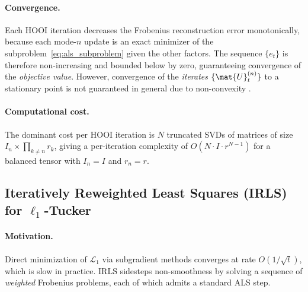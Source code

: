 \paragraph{Convergence.}
Each HOOI iteration decreases the Frobenius reconstruction error
monotonically, because each mode-$n$ update is an exact minimizer of the
subproblem~\eqref{eq:als_subproblem} given the other factors.
The sequence $\{e_t\}$ is therefore non-increasing and bounded below by
zero, guaranteeing convergence of the \emph{objective value}.
However, convergence of the \emph{iterates} $\{\mat{U}^{(n)}_t\}$ to a
stationary point is not guaranteed in general due to non-convexity
\cite{de2000best}.

\paragraph{Computational cost.}
The dominant cost per HOOI iteration is $N$ truncated SVDs of matrices of
size $I_n \times \prod_{k \neq n} r_k$, giving a per-iteration complexity
of $O\!\left(N \cdot I \cdot r^{N-1}\right)$ for a balanced tensor with
$I_n = I$ and $r_n = r$.

\subsection{Iteratively Reweighted Least Squares (IRLS) for $\ell_1$-Tucker}
\label{subsec:irls}

\paragraph{Motivation.}
Direct minimization of $\mathcal{L}_1$ via subgradient methods converges
at rate $O(1/\sqrt{t})$, which is slow in practice.
IRLS sidesteps non-smoothness by solving a sequence of \emph{weighted}
Frobenius problems, each of which admits a standard ALS step.

